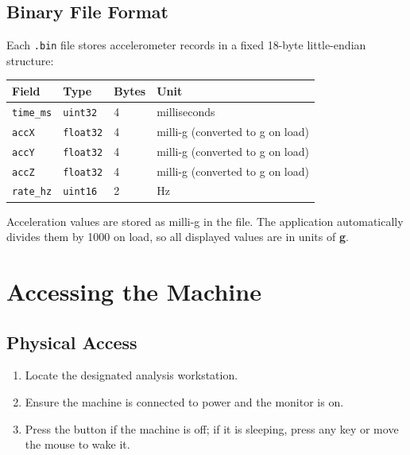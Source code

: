 \documentclass[12pt, a4paper]{article}
\newcommand{\key}[1]{%
  \fbox{\small\ttfamily #1}%
}
\begin{document}
\subsection{Binary File Format}

Each \texttt{.bin} file stores accelerometer records in a fixed 18-byte
little-endian structure:

\begin{center}
\begin{tabular}{llll}
\toprule
\textbf{Field} & \textbf{Type} & \textbf{Bytes} & \textbf{Unit}\\
\midrule
\texttt{time\_ms} & \texttt{uint32}  & 4 & milliseconds \\
\texttt{accX}     & \texttt{float32} & 4 & milli-g (converted to g on load) \\
\texttt{accY}     & \texttt{float32} & 4 & milli-g (converted to g on load) \\
\texttt{accZ}     & \texttt{float32} & 4 & milli-g (converted to g on load) \\
\texttt{rate\_hz} & \texttt{uint16}  & 2 & Hz \\
\bottomrule
\end{tabular}
\end{center}

\begin{notebox}
Acceleration values are stored as milli-g in the file.  The application
automatically divides them by 1000 on load, so all displayed values are
in units of \textbf{g}.
\end{notebox}

\section{Accessing the Machine}

\subsection{Physical Access}

\begin{enumerate}[leftmargin=*, label=\textbf{\arabic*.}]
  \item Locate the designated analysis workstation.
  \item Ensure the machine is connected to power and the monitor is on.
  \item Press the \key{Power} button if the machine is off; if it is
        sleeping, press any key or move the mouse to wake it.
\end{enumerate}
\end{document}

